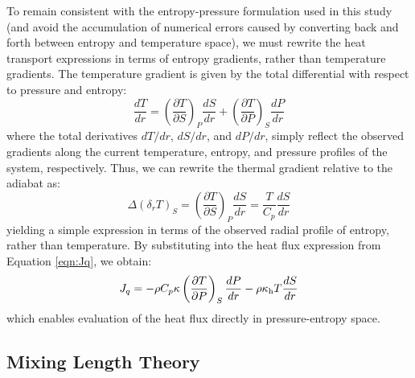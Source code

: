 To remain consistent with the entropy-pressure formulation used in this study (and avoid the accumulation of numerical errors caused by converting back and forth between entropy and temperature space), we must rewrite the heat transport expressions in terms of entropy gradients, rather than temperature gradients.
The temperature gradient is given by the total differential with respect to pressure and entropy:
\begin{equation}
  \frac{dT}{dr} = \left( \frac{\partial T}{\partial S}\right)_P \frac{dS}{dr} + 
  \left( \frac{\partial T}{\partial P}\right)_S \frac{dP}{dr}
\end{equation}
where the total derivatives $dT\big/dr$, $dS\big/dr$, and $dP\big/dr$, simply reflect the observed gradients along the current temperature, entropy, and pressure profiles of the system, respectively.
Thus, we can rewrite the thermal gradient relative to the adiabat as:
\begin{equation}
\label{eqn:thermgrad_s}
\Delta (\delta_r T)_S =   \left( \frac{\partial T}{\partial S}\right)_P \frac{dS}{dr} = 
\frac{T}{C_p} \frac{dS}{dr}
\end{equation}
yielding a simple expression in terms of the observed radial profile of entropy, rather than temperature.
By substituting into the heat flux expression from Equation \ref{eqn:Jq}, we obtain:
\begin{equation}
  J_q =-\rho C_p \kappa \left( \frac{\partial T}{\partial P}\right)_S \frac{dP}{dr} -
  \rho \kappa_{\rm h} T \frac{dS}{dr}
\label{eqn:Jq_s}
\end{equation}
which enables evaluation of the heat flux directly in pressure-entropy space.


\subsection{Mixing Length Theory}
\label{sec:mixinglenth}


